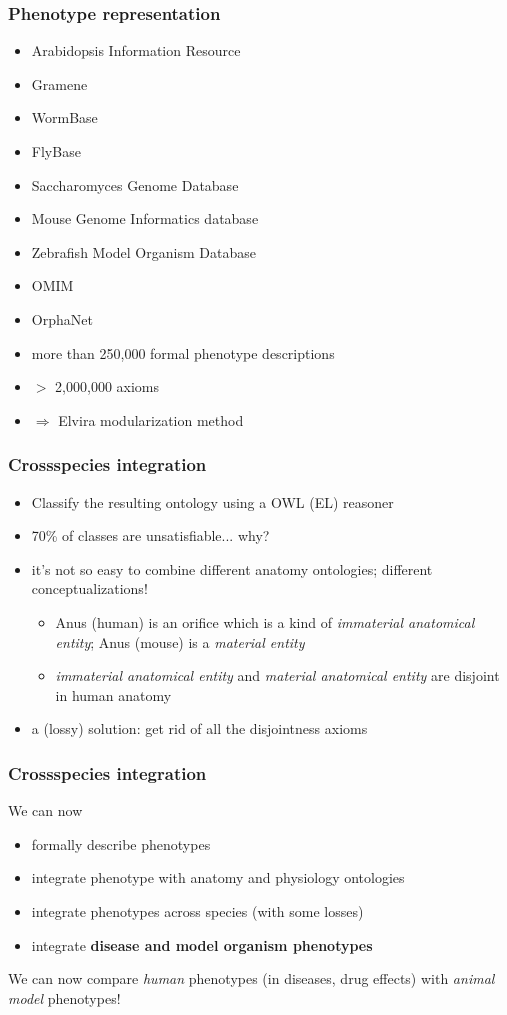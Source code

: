 \documentclass{beamer}
\renewcommand{\em}{\itshape}
\begin{document}
\begin{frame}
  \frametitle{Phenotype representation} 
\begin{itemize}
\item Arabidopsis Information Resource
\item Gramene
\item WormBase
\item FlyBase
\item Saccharomyces Genome Database
\item Mouse Genome Informatics database
\item Zebrafish Model Organism Database
\item OMIM
\item OrphaNet
\end{itemize}
\pause
\begin{itemize}
\item more than 250,000 formal phenotype descriptions
\item $>$ 2,000,000 axioms
\item $\Rightarrow$ Elvira modularization method
\end{itemize}
\end{frame}

\begin{frame}
  \frametitle{Crossspecies integration}
  \begin{itemize}
  \item Classify the resulting ontology using a OWL (EL) reasoner
    \pause 
  \item 70\% of classes are unsatisfiable... why?
    \pause
  \item it's not so easy to combine different anatomy ontologies;
    different conceptualizations!
    \begin{itemize}
    \item Anus (human) is an orifice which is a kind of {\em
        immaterial anatomical entity}; Anus (mouse) is a {\em material
        entity}
    \item {\em immaterial anatomical entity} and {\em material
        anatomical entity} are disjoint in human anatomy
    \end{itemize}
  \item a (lossy) solution: get rid of all the disjointness axioms
  \end{itemize}
\end{frame}

\begin{frame}
  \frametitle{Crossspecies integration}
  We can now 
  \begin{itemize}
  \item formally describe phenotypes
  \item integrate phenotype with anatomy and physiology ontologies
  \item integrate phenotypes across species (with some losses)
  \item integrate {\bf disease and model organism phenotypes}
  \end{itemize}
  We can now compare {\em human} phenotypes (in diseases, drug
  effects) with {\em animal model} phenotypes!
\end{frame}
\end{document}
